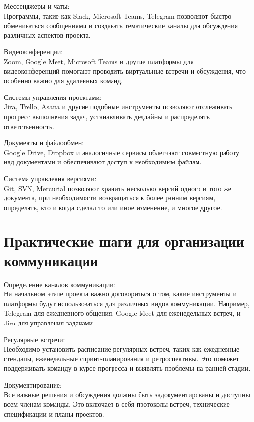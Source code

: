     Мессенджеры и чаты: \\
    Программы, такие как Slack, Microsoft Teams, Telegram позволяют быстро обмениваться сообщениями и создавать тематические каналы для обсуждения различных аспектов проекта.

    Видеоконференции: \\
    Zoom, Google Meet, Microsoft Teams и другие платформы для видеоконференций помогают проводить виртуальные встречи и обсуждения, что особенно важно для удаленных команд.
    
    Системы управления проектами: \\
    Jira, Trello, Asana и другие подобные инструменты позволяют отслеживать прогресс выполнения задач, устанавливать дедлайны и распределять ответственность.
    
    Документы и файлообмен: \\
    Google Drive, Dropbox и аналогичные сервисы облегчают совместную работу над документами и обеспечивают доступ к необходимым файлам.
    
    Система управления версиями: \\
    Git, SVN, Mercurial позволяют хранить несколько версий одного и того же документа, при необходимости возвращаться к более ранним версиям, определять, кто и когда сделал то или иное изменение, и многое другое.

    \section{Практические шаги для организации коммуникации}
    Определение каналов коммуникации: \\
    На начальном этапе проекта важно договориться о том, какие инструменты и платформы будут использоваться для различных видов коммуникации. Например, Telegram для ежедневного общения, Google Meet для еженедельных встреч, и Jira для управления задачами.
    
    Регулярные встречи: \\
    Необходимо установить расписание регулярных встреч, таких как ежедневные стендапы, еженедельные спринт-планирования и ретроспективы. Это поможет поддерживать команду в курсе прогресса и выявлять проблемы на ранней стадии.
    
    Документирование: \\
    Все важные решения и обсуждения должны быть задокументированы и доступны всем членам команды. Это включает в себя протоколы встреч, технические спецификации и планы проектов.
    
